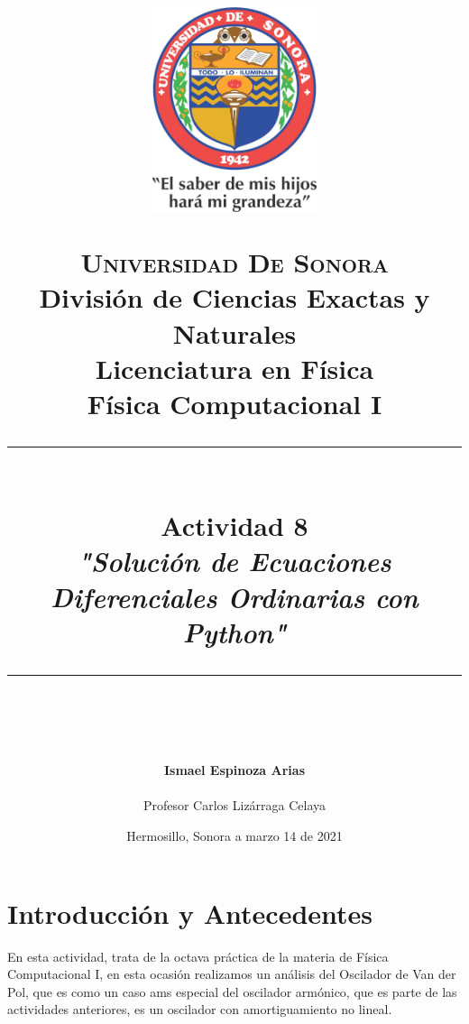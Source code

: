 \documentclass[12pt]{article}
\newcommand{\HRule}[1]{\rule{\linewidth}{#1}}
\begin{document}
\begin{titlepage}

\title{ \normalsize 
        \begin{center}
        \includegraphics[height=6cm]{Logo.jpg}
        \end{center}
        \LARGE \textsc{\textbf{Universidad De Sonora}} \\ \bigskip
		\Large División de Ciencias Exactas y Naturales \\
        Licenciatura en Física \\ \bigskip
        \bigskip
        Física Computacional I
		\\ [0.1cm]  
		\HRule{2pt} \\
		\Large \textbf{{Actividad 8}} \\
        \textit{\textbf{"Solución de Ecuaciones Diferenciales Ordinarias con Python"}}
		\HRule{2pt} \\
		\normalsize \vspace*{0.001\baselineskip}}
        
\date{\bigskip \Large  \hspace*{\fill} Hermosillo, Sonora a marzo 14 de 2021}

        
\author{
		\Large\textbf{ Ismael Espinoza Arias} \\ \bigskip
        \\ \bigskip
       \Large Profesor Carlos Lizárraga Celaya}
       \end{titlepage}
       \maketitle
       
       


\section*{Introducción y Antecedentes}
En esta actividad, trata de la octava práctica de la materia de Física Computacional I, en esta ocasión realizamos un análisis del Oscilador de Van der Pol, que es como un caso ams especial del oscilador armónico, que es parte de las actividades anteriores, es un oscilador con amortiguamiento no lineal.\\
\end{document}
